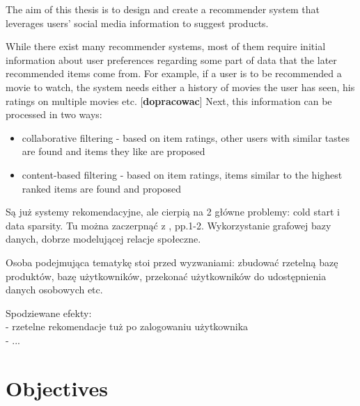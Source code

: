 \documentclass[12pt]{report}
\begin{document}
The aim of this thesis is to design and create a recommender system that leverages users' social media information to suggest products. 

While there exist many recommender systems, most of them require initial information about user preferences regarding some part of data that the later recommended items come from. For example, if a user is to be recommended a movie to watch, the system needs either a history of movies the user has seen, his ratings on multiple movies etc. [{\bf dopracowac}] Next, this information can be processed in two ways:
\begin{itemize}
\item collaborative filtering - based on item ratings, other users with similar tastes are found and items they like are proposed
\item content-based filtering - based on item ratings, items similar to the highest ranked items are found and proposed
\end{itemize}



Są już systemy rekomendacyjne, ale cierpią na 2 główne problemy: cold start i data sparsity. Tu można zaczerpnąć z \cite{snrs}, pp.1-2. 
Wykorzystanie grafowej bazy danych, dobrze modelującej relacje społeczne.

Osoba podejmująca tematykę stoi przed wyzwaniami: zbudować rzetelną bazę produktów, bazę użytkowników, przekonać użytkowników do udostępnienia danych osobowych etc.

Spodziewane efekty:\\
- rzetelne rekomendacje tuż po zalogowaniu użytkownika\\
- ...\\



\section{Objectives}
\end{document}
